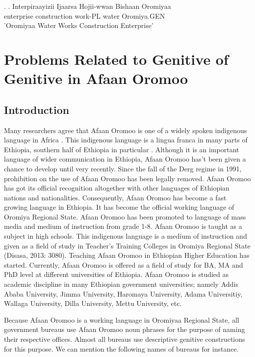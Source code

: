 \documentclass[11pt,a4paper]{article}
\begin{document}
	\ex.
	\ag.
	Interpiraayizii Ijaarsa Hojii-wwan Bishaan Oromiyaa\\
	enterprise construction work-PL water Oromiya.GEN\\
	'Oromiyaa Water Works Construction Enterprise'\\
	
	
	
	



	
	\section{Problems Related to Genitive of Genitive in Afaan Oromoo}

\subsection{Introduction}

Many researchers agree that Afaan Oromoo is one of a widely spoken indigenous language in Africa \cite{bulcha1997politics}. This indigenous language is a lingua franca in many parts of Ethiopia, southern half of Ethiopia in particular \cite[326]{bulcha1997politics}. Although it is an important language of wider communication in Ethiopia, Afaan Oromoo has’t been given a chance to develop until very recently. Since the fall of the Derg regime in 1991, prohibition on the use of Afaan Oromoo has been legally removed. Afaan Oromoo has got its official recognition altogether with other languages of Ethiopian nations and nationalities.  Consequently, Afaan Oromoo has become a fast growing language in Ethiopia. It has become the official working language of Oromiya Regional State. Afaan Oromoo has been 
promoted to language of mass media and medium of instruction from grade 1-8. Afaan Oromoo is taught as a subject in high schools. This indigenous language is a medium of instruction and given as a field of study in Teacher’s Training Colleges in Oromiya Regional State (Disasa, 2013: 3080). Teaching Afaan 
Oromoo in Ethiopian Higher Education has started. Currently, Afaan Oromoo is offered as a field of study for BA, MA and PhD level at different universities of Ethiopia. Afaan Oromoo is studied as academic discipline in many Ethiopian government universities; namely Addis Ababa University, 
Jimma University, Haromaya University, Adama Universitiy, Wallaga University, Dilla University, Mettu University, etc. 

Because Afaan Oromoo is a working language in Oromiyaa Regional State, all government bureaus use Afaan Oromoo noun phrases for the purpose of naming their respective offices. Almost all bureaus use descriptive genitive constructions for this purpose. We can mention the following names of bureaus for instance. 
\end{document}
